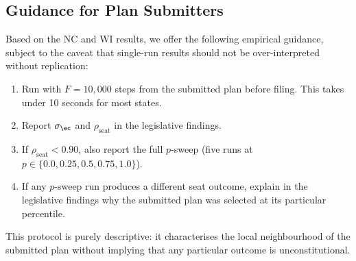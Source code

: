 \subsection{Guidance for Plan Submitters}

Based on the NC and WI results, we offer the following empirical guidance,
subject to the caveat that single-run results should not be over-interpreted
without replication:
\begin{enumerate}
  \item Run \flip{} with $F = 10{,}000$ steps from the submitted plan before
        filing. This takes under 10 seconds for most states.
  \item Report $\sigma_{\ec}$ and $\rho_{\mathrm{seat}}$ in the legislative findings.
  \item If $\rho_{\mathrm{seat}} < 0.90$, also report the full $p$-sweep (five
        runs at $p \in \{0.0, 0.25, 0.5, 0.75, 1.0\}$).
  \item If any $p$-sweep run produces a different seat outcome, explain in the
        legislative findings why the submitted plan was selected at its
        particular percentile.
\end{enumerate}
This protocol is purely descriptive: it characterises the local neighbourhood
of the submitted plan without implying that any particular outcome is
unconstitutional.
